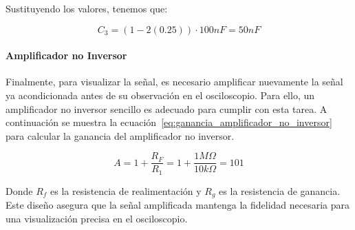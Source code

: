                     Sustituyendo los valores, tenemos que:

                    \begin{equation}
                        C_3 = (1 - 2(0.25)) \cdot 100 nF = 50 nF
                    \end{equation}

            \paragraph{Amplificador no Inversor}
                Finalmente, para visualizar la señal, es necesario amplificar nuevamente la señal ya acondicionada antes de su observación en el osciloscopio. Para ello, un amplificador no inversor sencillo es adecuado para cumplir con esta tarea. A continuación se muestra la ecuación~\ref{eq:ganancia_amplificador_no_inversor} para calcular la ganancia del amplificador no inversor.

                \begin{equation}
                    \label{eq:ganancia_amplificador_no_inversor}
                    A = 1 + \frac{R_F}{R_{1}} = 1 + \frac{1 M\Omega}{10 k\Omega} = 101
                \end{equation}

                Donde $R_f$ es la resistencia de realimentación y $R_g$ es la resistencia de ganancia. Este diseño asegura que la señal amplificada mantenga la fidelidad necesaria para una visualización precisa en el osciloscopio.


